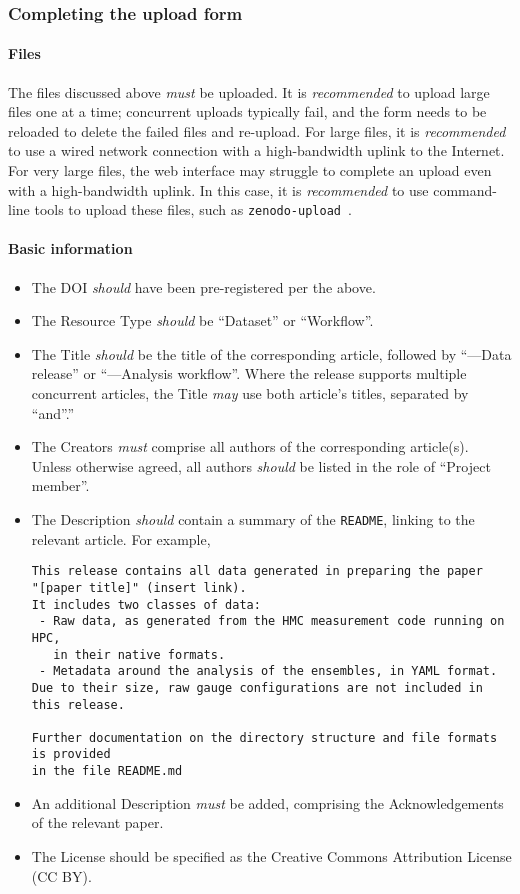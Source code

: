 \documentclass{article}
\newcommand\rfcword[1]{\emph{#1}\xspace}
\newcommand\must{\rfcword{must}}
\newcommand\should{\rfcword{should}}
\newcommand\recommended{\rfcword{recommended}}
\newcommand\may{\rfcword{may}}
\newcommand\filename[1]{\texttt{#1}\xspace}
\newcommand\readme{\filename{README}\xspace}
\begin{document}
\subsubsection{Completing the upload form}

\paragraph{Files}

The files discussed above \must be uploaded.
It is \recommended to upload large files one at a time;
concurrent uploads typically fail,
and the form needs to be reloaded to delete the failed files and re-upload.
For large files,
it is \recommended to use a wired network connection
with a high-bandwidth uplink to the Internet.
For very large files,
the web interface may struggle to complete an upload even with a high-bandwidth uplink.
In this case,
it is \recommended to use command-line tools to upload these files,
such as \verb|zenodo-upload|~\cite{zenodo-upload}.


\paragraph{Basic information}

\begin{itemize}
  \item
        The DOI \should have been pre-registered per the above.
  \item
        The Resource Type \should be ``Dataset'' or ``Workflow''.
  \item
        The Title \should be the title of the corresponding article,
        followed by ``---Data release'' or ``---Analysis workflow''.
        Where the release supports multiple concurrent articles,
        the Title \may use both article's titles,
        separated by ``and''.''
  \item
        The Creators \must comprise all authors of the corresponding article(s).
        Unless otherwise agreed,
        all authors \should be listed in the role of ``Project member''.
  \item
        The Description \should contain a summary of the \readme,
        linking to the relevant article.
        For example,
\begin{verbatim}
This release contains all data generated in preparing the paper
"[paper title]" (insert link).
It includes two classes of data:
 - Raw data, as generated from the HMC measurement code running on HPC,
   in their native formats.
 - Metadata around the analysis of the ensembles, in YAML format.
Due to their size, raw gauge configurations are not included in this release.

Further documentation on the directory structure and file formats is provided
in the file README.md
\end{verbatim}
  \item
        An additional Description \must be added,
        comprising the Acknowledgements of the relevant paper.
  \item
        The License should be specified as the Creative Commons Attribution License
        (CC BY).
\end{itemize}
\end{document}
